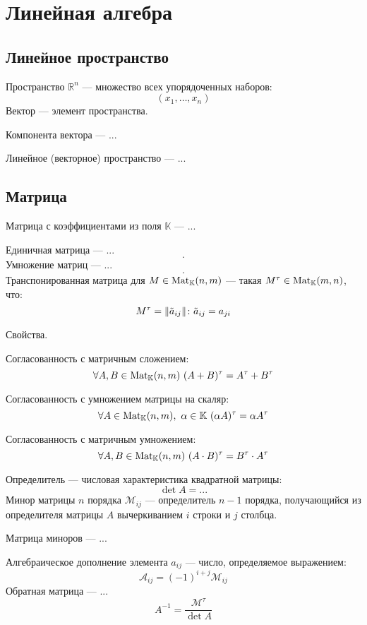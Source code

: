 \section{Линейная алгебра}

\subsection{Линейное пространство}

{\bold Пространство} $\mathbb{R}^n$ --- множество всех упорядоченных наборов:
$$(x_1,\dots,x_n)$$
{\bold Вектор} --- элемент пространства.

{\bold Компонента вектора} --- ...

{\bold Линейное {\ital (векторное)} пространство} --- ...

\subsection{Матрица}

{\bold Матрица} с коэффициентами из поля $\mathbb{K}$ --- ...

{\bold Единичная матрица} --- ...
$$.$$
{\bold Умножение матриц} --- ...
$$.$$
{\bold Транспонированная матрица} для $M\in\mathrm{Mat}_{\mathbb{K}}(n,m)$ --- такая $M^{\tau}\in\mathrm{Mat}_{\mathbb{K}}(m,n)$, что:
$$M^{\tau}=\lVert\tilde{a}_{ij}\rVert\colon\tilde{a}_{ij}=a_{ji}$$
\begin{theorem}
{\bold Свойства.}
\begin{list*}[][\#]
\item Согласованность с матричным сложением:
$$\forall A,B\in\Mat_{\mathbb{K}}(n,m)\ (A+B)^\tau=A^\tau+B^\tau$$
\item Согласованность с умножением матрицы на скаляр:
$$\forall A\in\Mat_{\mathbb{K}}(n,m),\ \alpha\in\mathbb{K}\ (\alpha A)^\tau=\alpha A^\tau$$
\item Согласованность с матричным умножением:
$$\forall A,B\in\mathrm{Mat}_{\mathbb{K}}(n,m)\ (A\cdot B)^\tau=B^\tau\cdot A^\tau$$
\end{list*}
\end{theorem}
{\bold Определитель} --- числовая характеристика квадратной матрицы:
$$\det A=...$$
{\bold Минор матрицы} $n$ порядка $\mathcal{M}_{ij}$ --- определитель $n-1$ порядка, получающийся из определителя матрицы $A$ вычеркиванием $i$ строки и $j$ столбца.

{\bold Матрица миноров} --- ...

{\bold Алгебраическое дополнение} элемента $a_{ij}$ --- число, определяемое выражением:
$$\mathcal{A}_{ij}=(-1)^{i+j}\mathcal{M}_{ij}$$
{\bold Обратная матрица} --- ...
$$A^{-1}=\frac{\mathcal{M}^{\tau}}{\det A}$$

